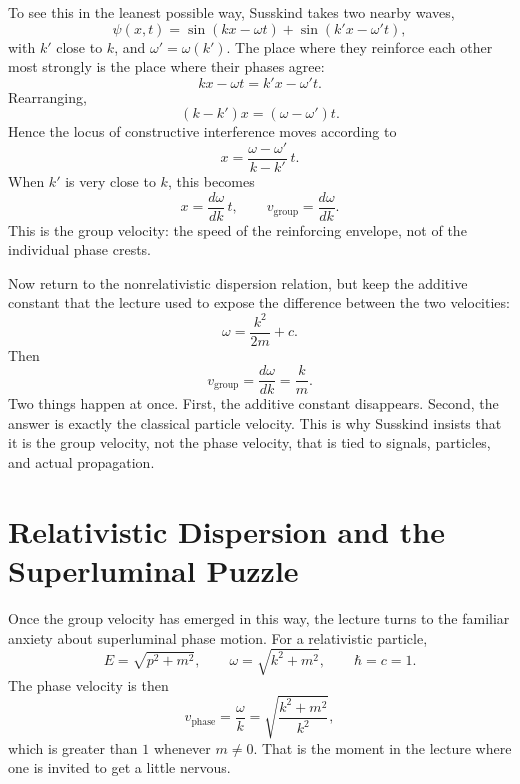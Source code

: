 To see this in the leanest possible way, Susskind takes two nearby waves,
\begin{equation}
\psi(x,t)=\sin(kx-\omega t)+\sin(k'x-\omega' t),
\end{equation}
with \(k'\) close to \(k\), and \(\omega'=\omega(k')\). The place where they reinforce each other most strongly is the place where their phases agree:
\begin{equation}
kx-\omega t=k'x-\omega' t.
\end{equation}
Rearranging,
\begin{equation}
(k-k')x=(\omega-\omega')t.
\end{equation}
Hence the locus of constructive interference moves according to
\begin{equation}
x=\frac{\omega-\omega'}{k-k'}\,t.
\end{equation}
When \(k'\) is very close to \(k\), this becomes
\begin{equation}
x=\frac{d\omega}{dk}\,t,
\qquad
v_{\mathrm{group}}=\frac{d\omega}{dk}.
\end{equation}
This is the group velocity: the speed of the reinforcing envelope, not of the individual phase crests.

Now return to the nonrelativistic dispersion relation, but keep the additive constant that the lecture used to expose the difference between the two velocities:
\begin{equation}
\omega=\frac{k^2}{2m}+c.
\end{equation}
Then
\begin{equation}
v_{\mathrm{group}}=\frac{d\omega}{dk}=\frac{k}{m}.
\end{equation}
Two things happen at once. First, the additive constant disappears. Second, the answer is exactly the classical particle velocity. This is why Susskind insists that it is the group velocity, not the phase velocity, that is tied to signals, particles, and actual propagation.

\section{Relativistic Dispersion and the Superluminal Puzzle}

Once the group velocity has emerged in this way, the lecture turns to the familiar anxiety about superluminal phase motion. For a relativistic particle,
\begin{equation}
E=\sqrt{p^2+m^2},
\qquad
\omega=\sqrt{k^2+m^2},
\qquad
\hbar=c=1.
\end{equation}
The phase velocity is then
\begin{equation}
v_{\mathrm{phase}}=\frac{\omega}{k}
=
\sqrt{\frac{k^2+m^2}{k^2}},
\end{equation}
which is greater than \(1\) whenever \(m\neq 0\). That is the moment in the lecture where one is invited to get a little nervous.

